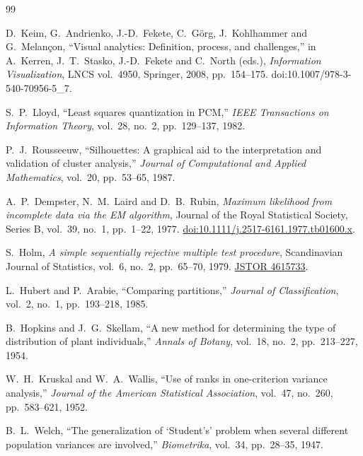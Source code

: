 \begin{thebibliography}{99}

D.~Keim, G.~Andrienko, J.-D.~Fekete, C.~G\"{o}rg, J.~Kohlhammer and
G.~Melan\c{c}on, ``Visual analytics: Definition, process, and challenges,''
in A.~Kerren, J.~T.~Stasko, J.-D.~Fekete and C.~North (eds.),
\emph{Information Visualization}, LNCS vol.~4950, Springer, 2008,
pp.~154--175. doi:10.1007/978-3-540-70956-5\_7.

S.~P.~Lloyd, ``Least squares quantization in PCM,''
\emph{IEEE Transactions on Information Theory}, vol.~28, no.~2,
pp.~129--137, 1982.

P.~J.~Rousseeuw, ``Silhouettes: A graphical aid to the interpretation and
validation of cluster analysis,'' \emph{Journal of Computational and Applied
Mathematics}, vol.~20, pp.~53--65, 1987.

A.~P.~Dempster, N.~M.~Laird and D.~B.~Rubin, \emph{Maximum likelihood from
incomplete data via the EM algorithm}, Journal of the Royal Statistical
Society, Series B, vol.~39, no.~1, pp.~1--22, 1977.
\href{https://doi.org/10.1111/j.2517-6161.1977.tb01600.x}{doi:10.1111/j.2517-6161.1977.tb01600.x}.

S.~Holm, \emph{A simple sequentially rejective multiple test procedure},
Scandinavian Journal of Statistics, vol.~6, no.~2, pp.~65--70,
1979. \href{https://www.jstor.org/stable/4615733}{JSTOR 4615733}.

L.~Hubert and P.~Arabie, ``Comparing partitions,''
\emph{Journal of Classification}, vol.~2, no.~1, pp.~193--218, 1985.

B.~Hopkins and J.~G.~Skellam, ``A new method for determining the type of
distribution of plant individuals,'' \emph{Annals of Botany}, vol.~18, no.~2,
pp.~213--227, 1954.

W.~H.~Kruskal and W.~A.~Wallis, ``Use of ranks in one-criterion variance
analysis,'' \emph{Journal of the American Statistical Association}, vol.~47,
no.~260, pp.~583--621, 1952.

B.~L.~Welch, ``The generalization of `Student's' problem when several
different population variances are involved,'' \emph{Biometrika}, vol.~34,
pp.~28--35, 1947.


\end{thebibliography}
